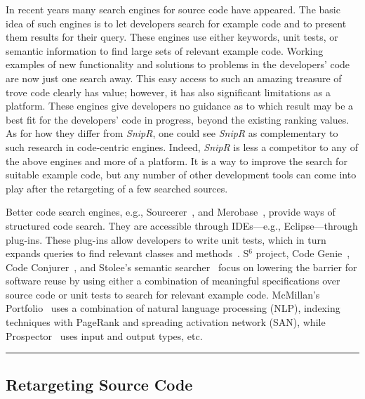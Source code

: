 In recent years many search engines for source code have appeared. The basic idea of such engines is to let developers search for example code and to present them results for their query. These engines use either keywords, unit tests, or semantic information to find large sets of relevant example code. Working examples of new functionality and solutions to problems in the developers’ code are now just one search away. This easy access to such an amazing treasure of trove code clearly has value; however, it has also significant limitations as a platform. These engines give developers no guidance as to which result may be a best fit for the developers' code in progress, beyond the existing ranking values. As for how they differ from \emph{SnipR}, one could see \emph{SnipR} as complementary to such research in code-centric engines. Indeed, \emph{SnipR} is less a competitor to any of the above engines and more of a platform. It is a way to improve the search for suitable example code, but any number of other development tools can come into play after the retargeting of a few searched sources. 
         

Better code search engines, e.g., Sourcerer~\cite{Bajracharya:2006vn}, and Merobase~\cite{Hummel:eq}, provide ways of structured code search. They are accessible through IDEs---e.g., Eclipse---through plug-ins. These plug-ins allow developers to write unit tests, which in turn expands queries to find relevant classes and methods~\cite{Hummel:eq}. S$^{6}$ project\cite{Reiss:2009fu}, Code Genie~\cite{LazzariniLemos:2007jh}, Code Conjurer~\cite{Hummel:eq}, and Stolee's semantic searcher~\cite{Stolee:2012wp} focus on lowering the barrier for software reuse by using either a combination of meaningful specifications over source code or unit tests to search for relevant example code. McMillan's Portfolio~\cite{McMillan:2011cm, McMillan:2011wq} uses a combination of natural language processing (NLP), indexing techniques with PageRank and spreading activation network (SAN), while Prospector~\cite{Mandelin:2005uj} uses input and output types, etc.

\fancybreak{\pfbreakdisplay}

\subsection{Retargeting Source Code}
\label{sec:retargetingcode}


